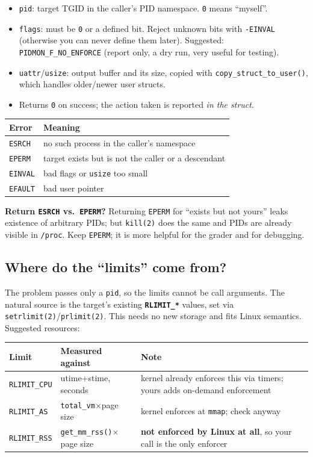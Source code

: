 \documentclass[11pt,a4paper]{article}
\begin{document}
\begin{itemize}
  \item \texttt{pid}: target TGID in the caller's PID namespace. \texttt{0} means ``myself''.
  \item \texttt{flags}: must be \texttt{0} or a defined bit. Reject unknown bits with \texttt{-EINVAL} (otherwise you can never define them later). Suggested: \texttt{PIDMON\_F\_NO\_ENFORCE} (report only, a dry run, very useful for testing).
  \item \texttt{uattr}/\texttt{usize}: output buffer and its size, copied with \texttt{copy\_struct\_to\_user()}, which handles older/newer user structs.
  \item Returns \texttt{0} on success; the action taken is reported \emph{in the struct}.
\end{itemize}

\begin{tabular}{@{}ll@{}}
\toprule
Error & Meaning \\
\midrule
\texttt{ESRCH} & no such process in the caller's namespace \\
\texttt{EPERM} & target exists but is not the caller or a descendant \\
\texttt{EINVAL} & bad flags or \texttt{usize} too small \\
\texttt{EFAULT} & bad user pointer \\
\bottomrule
\end{tabular}

\begin{decision}
\textbf{Return \texttt{ESRCH} vs.\ \texttt{EPERM}?} Returning \texttt{EPERM} for ``exists but not yours'' leaks existence of arbitrary PIDs; but \texttt{kill(2)} does the same and PIDs are already visible in \texttt{/proc}. Keep \texttt{EPERM}; it is more helpful for the grader and for debugging.
\end{decision}

\subsection{Where do the ``limits'' come from?}
The problem passes only a \texttt{pid}, so the limits cannot be call arguments. The natural source is the target's existing \textbf{\texttt{RLIMIT\_*}} values, set via \texttt{setrlimit(2)}/\texttt{prlimit(2)}. This needs no new storage and fits Linux semantics. Suggested resources:

\begin{center}\small
\begin{tabular}{@{}lll@{}}
\toprule
Limit & Measured against & Note \\
\midrule
\texttt{RLIMIT\_CPU} & utime+stime, seconds & kernel already enforces this via timers; yours adds on-demand enforcement \\
\texttt{RLIMIT\_AS} & \texttt{total\_vm}$\times$page size & kernel enforces at \texttt{mmap}; check anyway \\
\texttt{RLIMIT\_RSS} & \texttt{get\_mm\_rss()}$\times$page size & \textbf{not enforced by Linux at all}, so your call is the only enforcer \\
\bottomrule
\end{tabular}
\end{center}
\end{document}
